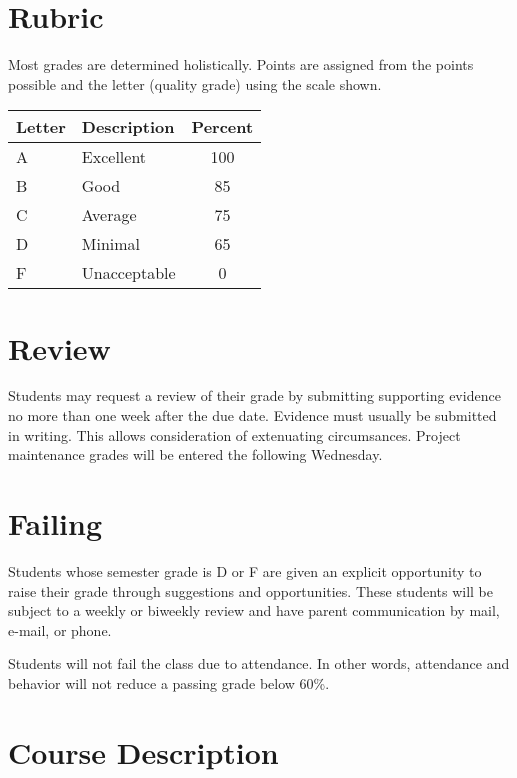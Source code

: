 \documentclass[letterpaper,10pt]{memoir}
\begin{document}
\noindent


\section*{Rubric}

Most grades are determined holistically.
%
Points are assigned from the points possible and the letter (quality grade) using the scale shown.

	\begin{center}
	{%
	\renewcommand{\arraystretch}{1.5}
	\begin{tabular}{ l l c }
		Letter & Description	&	Percent	\\
		\midrule
		A & Excellent		&	100	\\
		B & Good				&   85	\\
		C & Average			&   75	\\
		D & Minimal			&   65	\\
		F & Unacceptable	&    0	\\
	\end{tabular}
	}%
	\end{center}


\section*{Review}
Students may request a review of their grade by submitting supporting evidence no more than one week after the due date. Evidence must usually be submitted in writing. This allows consideration of extenuating circumsances. Project maintenance grades will be entered the following Wednesday.

\section*{Failing}
Students whose semester grade is D or F are given an explicit opportunity to raise their grade through suggestions and opportunities. These students will be subject to a weekly or biweekly review and have parent communication by mail, e-mail, or phone.

Students will not fail the class due to attendance. In other words, attendance and behavior will not reduce a passing grade below 60\%.






\newpage
\section*{Course Description}
\end{document}
